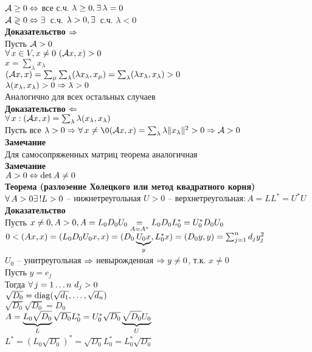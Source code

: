 \documentclass[12pt]{article}
\begin{document}
$\mcA \geq 0 \LRto$ все с.ч. $\lambda \geq 0, \ex \lambda = 0$\\
$\mcA \gtrless 0 \LRto \ex$ с.ч. $\lambda > 0, \ex$ с.ч. $\lambda < 0$\\
\textbf{Доказательство $\Rto$}\\
Пусть $\mcA > 0$\\
$\fall x \in V, x\neq 0\ (\mcA x, x) > 0$\\
$x = \sum_\lambda x_\lambda$\\
$(\mcA x, x) = \sum_\mu\sum_\lambda (\lambda x_\lambda, x_\mu) = \sum_\lambda (\lambda x_\lambda, x_\lambda) > 0$\\
$\lambda(x_\lambda, x_\lambda) > 0 \Rto \lambda > 0$\\
Аналогично для всех остальных случаев\\
\textbf{Доказательство $\Lto$}\\
$\fall x: (\mcA x, x) = \sum_\lambda \lambda(x_\lambda, x_\lambda)$\\
Пусть все $\lambda > 0 \Rto \fall x \neq \0 (\mcA x, x) = \sum_{\lambda} \lambda\|x_\lambda\|^2 > 0 \Rto \mcA > 0$\\
\textbf{Замечание}\\
Для самосопряженных матриц теорема аналогичная\\
\textbf{Замечание}\\
$A > 0 \LRto \det A \neq 0$\\
\textbf{Теорема (разлоэение Холецкого или метод квадратного корня)}\\
$\fall A > 0 \ex ! L > 0$ -- нижнетреугольная $U>0$ -- верхнетреугольная$: A = LL^* = U^*U$\\
\textbf{Доказательство}\\
Пусть $x \neq 0, A > 0, A= L_0 D_0 U_0 \us{A=A^*}= L_0D_0L_0^* = U_0^*D_0U_0$\\
$0 < (Ax, x) = (L_0D_0U_0x, x) = (D_0\ub{y}{U_0x}, L_0^*x) = (D_0y, y) = \sum_{j=1}^n d_j y_j^2$\\
$U_0$ -- унитреугольная $\Rto$ невырожденная $\Rto y\neq 0$, т.к. $x\neq 0$\\
Пусть $y = e_j$\\
Тогда $\fall j = 1 \ldots n\ d_j > 0$\\
$\sqrt{D_0} = \nm{diag}(\sqrt{d_1}, \ldots, \sqrt{d_n})$\\
$\sqrt{D_0}\sqrt{D_0} = D_0$\\
$A = \ub{L}{L_0\sqrt{D_0}}\sqrt{D_0}L_0^* = U_0^* \sqrt{D_0}\ub{U}{\sqrt{D_0}U_0}$\\
$L^* = (L_0\sqrt{D_0})^* = \sqrt{D_0}L_0^* = L_0^*\sqrt{D_0}$\\
\end{document}
